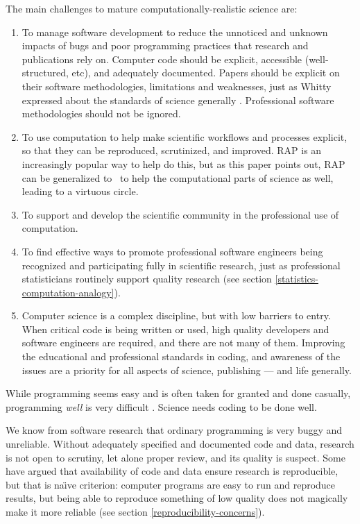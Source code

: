\documentclass{comjnl}
\begin{document}
The main challenges to mature computationally-realistic science are:

\begin{enumerate}\raggedright
\itemsep=1.5ex

\item 
To manage software development to reduce the unnoticed and unknown impacts of bugs and poor programming practices that research and publications rely on. Computer code should be explicit, accessible (well-structured, etc), and adequately documented. Papers should be explicit on their software methodologies, limitations and weaknesses, just as Whitty expressed about the standards of science generally \cite{whitty}. Professional software methodologies should not be ignored.

\item 
To use computation to help make scientific workflows and processes explicit, so that they can be reproduced, scrutinized, and improved. RAP is an increasingly popular way to help do this, but as this paper points out, RAP can be generalized to \RAPstar\ to help the computational parts of science as well, leading to a virtuous circle.

\item
To support and develop the scientific community in the professional use of computation.

\item
To find effective ways to promote professional software engineers being recognized and participating fully in scientific research, just as professional statisticians routinely support quality research (see section \ref{statistics-computation-analogy}).

\item
Computer science is a complex discipline, but with low barriers to entry. When critical code is being written or used, high quality developers and software engineers are required, and there are not many of them. Improving the educational and professional standards in coding, and awareness of the issues are a priority for all aspects of science, publishing --- and life generally.
\end{enumerate}

While programming seems easy and is often taken for granted and done casually, programming \emph{well\/} is very difficult \cite{fixit}. Science needs coding to be done well. 

We know from software research that ordinary programming is very buggy and unreliable. Without adequately specified and documented code and data, research is not open to scrutiny, let alone proper review, and its quality is suspect. Some have argued that availability of code and data ensure research is reproducible, but that is na\"\i ve criterion: computer programs are easy to run and reproduce results, but being able to reproduce something of low quality does not magically make it more reliable \cite{reproducibility,relit,popper-conjectures-refutations} (see section \ref{reproducibility-concerns}). 
\end{document}
